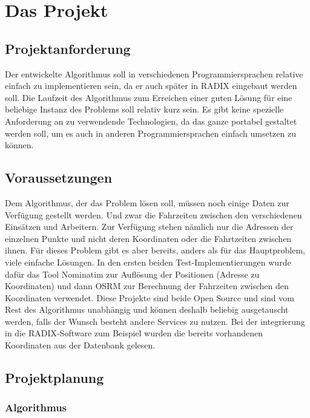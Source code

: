 \documentclass[a4paper,notitlepage,12pt]{report}
\begin{document}
\chapter{Das Projekt}

\section{Projektanforderung}

Der entwickelte Algorithmus soll in verschiedenen Programmiersprachen relative
einfach zu implementieren sein, da er auch später in RADIX eingebaut werden soll.
Die Laufzeit des Algorithmus zum Erreichen einer guten Lösung für eine beliebige
Instanz des Problems soll relativ kurz sein. Es gibt keine spezielle Anforderung
an zu verwendende Technologien, da das ganze portabel gestaltet werden soll, um
es auch in anderen Programmiersprachen einfach umsetzen zu können.

\section{Voraussetzungen}

Dem Algorithmus, der das Problem lösen soll, müssen noch einige Daten zur
Verfügung gestellt werden. Und zwar die Fahrzeiten zwischen den verschiedenen
Einsätzen und Arbeitern. Zur Verfügung stehen nämlich nur die Adressen der
einzelnen Punkte und nicht deren Koordinaten oder die Fahrtzeiten zwischen ihnen.
Für dieses Problem gibt es aber bereits, anders als für das Hauptproblem, viele
einfache Lösungen. In den ersten beiden Test-Implementierungen wurde dafür das
Tool Nominatim \cite{nominatim} zur Auflösung der Positionen (Adresse zu Koordinaten) und dann
OSRM \cite{osrm} zur Berechnung der Fahrzeiten zwischen den Koordinaten verwendet. Diese
Projekte sind beide Open Source und sind vom Rest des Algorithmus unabhängig
und können deshalb beliebig ausgetauscht werden, falls der Wunsch besteht
andere Services zu nutzen. Bei der integrierung in die RADIX-Software zum
Beispiel wurden die bereits vorhandenen Koordinaten aus der Datenbank gelesen.

\section{Projektplanung}

\subsection{Algorithmus}
\end{document}
